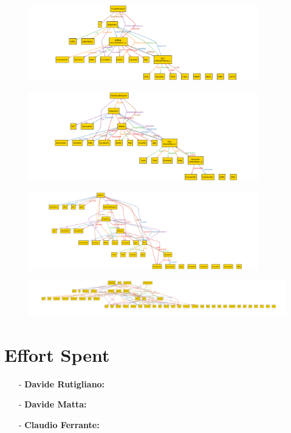 \documentclass[a4paper]{article}
\begin{document}
\begin{figure}[!htpb]
	\centering
	\includegraphics[width=100mm]{images/alloy/enrollToRun.png}
\end{figure}



\begin{figure}[!htpb]
	\centering
	\includegraphics[width=100mm]{images/alloy/watchRun.png}
\end{figure}


\newpage
\begin{figure}[!htpb]
	\centering
	\includegraphics[width=100mm]{images/alloy/Track4RunComplete.png}
\end{figure}


\newpage
\begin{figure}[!htpb]
	\centering
	\includegraphics[width=200mm, angle = 90]{images/alloy/TrackMeComplete.png}
\end{figure}
\newpage
\section{Effort Spent}
    \begin{itemize}
        \item[-] \textbf{Davide Rutigliano:}
        
        \item[-] \textbf{Davide Matta:}
        
        \item[-] \textbf{Claudio Ferrante:}
    \end{itemize}
\end{document}

